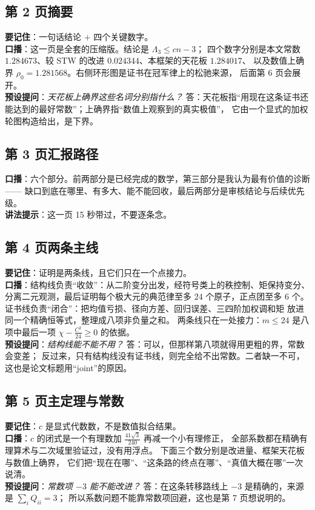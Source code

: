 \documentclass[UTF8,11pt]{ctexart}
\newcommand{\Lam}{\Lambda}
\begin{document}
\subsection*{第 2 页\quad 摘要}
\textbf{要记住}：一句话结论 $+$ 四个关键数字。\\
\textbf{口播}：这一页是全套的压缩版。结论是 $\Lam_3\le cn-3$；
四个数字分别是本文常数 $1.284673$、较 STW 的改进 $0.024344$、本框架的天花板 $1.284017$、
以及数值上确界 $\rho_0=1.281568$。右侧环形图是证书在冠军律上的松驰来源，
后面第 6 页会展开。\\
\textbf{预设提问}：\emph{天花板上确界这些名词分别指什么？}
答：天花板指``用现在这条证书还能达到的最好常数''；上确界指``数值上观察到的真实极值''，
它由一个显式的加权轮图构造给出，是下界。

\subsection*{第 3 页\quad 汇报路径}
\textbf{口播}：六个部分。前两部分是已经完成的数学，第三部分是我认为最有价值的诊断——
缺口到底在哪里、有多大、能不能回收，最后两部分是审核结论与后续优先级。\\
\textbf{讲法提示}：这一页 15 秒带过，不要逐条念。

\subsection*{第 4 页\quad 两条主线}
\textbf{要记住}：证明是两条线，且它们只在一个点接力。\\
\textbf{口播}：结构线负责``收敛''：从二阶变分出发，经符号类上的秩控制、矩保持变分、
分离二元观测，最后证明每个极大元的典范律至多 $24$ 个原子，正点团至多 $6$ 个。
证书线负责``闭合''：把均值亏损、径向方差、回归误差、三四阶加权调和矩
放进同一个精确恒等式，整理成八项非负量之和。
两条线只在一处接力：$m\le24$ 是八项中最后一项 $\chi-\frac{C^2}{24}\ge0$ 的依据。\\
\textbf{预设提问}：\emph{结构线能不能不用？}
答：可以，但那样第八项就得用更粗的界，常数会变差；
反过来，只有结构线没有证书线，则完全给不出常数。二者缺一不可，这也是论文标题用``joint''的原因。

\subsection*{第 5 页\quad 主定理与常数}
\textbf{要记住}：$c$ 是显式代数数，不是数值拟合结果。\\
\textbf{口播}：$c$ 的闭式是一个有理数加 $\frac{41\sqrt3}{240}$ 再减一个小有理修正，
全部系数都在精确有理算术与二次域里验证过，没有用浮点。
下面三个数分别是改进量、框架天花板与数值上确界，
它们把``现在在哪''、``这条路的终点在哪''、``真值大概在哪''一次说清。\\
\textbf{预设提问}：\emph{常数项 $-3$ 能不能改进？}
答：在这条转移路线上 $-3$ 是精确的，来源是 $\sum_iQ_{ii}=3$；
所以系数问题不能靠常数项回避，这也是第 7 页想说明的。
\end{document}
